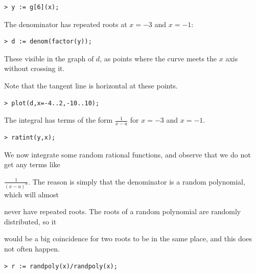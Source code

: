 \documentclass{article}
\begin{document}
\begin{lstlisting}
> y := g[6](x);
\end{lstlisting}
\begin{Maple Normal}
The denominator has repeated roots at 
$x =-3$ and 
$x =-1$:
\end{Maple Normal}
\begin{lstlisting}
> d := denom(factor(y));
\end{lstlisting}
\begin{Maple Normal}
These visible in the graph of 
$d$, as points where the curve meets the 
$x$ axis without crossing it.
\end{Maple Normal}
\begin{Maple Normal}
Note that the tangent line is horizontal at these points.
\end{Maple Normal}
\begin{lstlisting}
> plot(d,x=-4..2,-10..10);
\end{lstlisting}
\begin{Maple Normal}
The integral has terms of the form 
$\frac{1}{x -u}$ for 
$x =-3$ and 
$x =-1$.
\end{Maple Normal}
\begin{lstlisting}
> ratint(y,x);
\end{lstlisting}
\begin{Maple Normal}

\end{Maple Normal}
\begin{Maple Normal}

\end{Maple Normal}
\begin{Maple Normal}
We now integrate some random rational functions, and observe that we do not get any terms like
\end{Maple Normal}
\begin{Maple Normal}

$\frac{1}{(x -u)^{n}}$.  The reason is simply that the denominator is a random polynomial, which will almost
\end{Maple Normal}
\begin{Maple Normal}
never have repeated roots.  The roots of a random polynomial are randomly distributed, so it 
\end{Maple Normal}
\begin{Maple Normal}
would be a big coincidence for two roots to be in the same place, and this does not often happen.
\end{Maple Normal}
\begin{lstlisting}
> r := randpoly(x)/randpoly(x);
\end{lstlisting}
\end{document}
